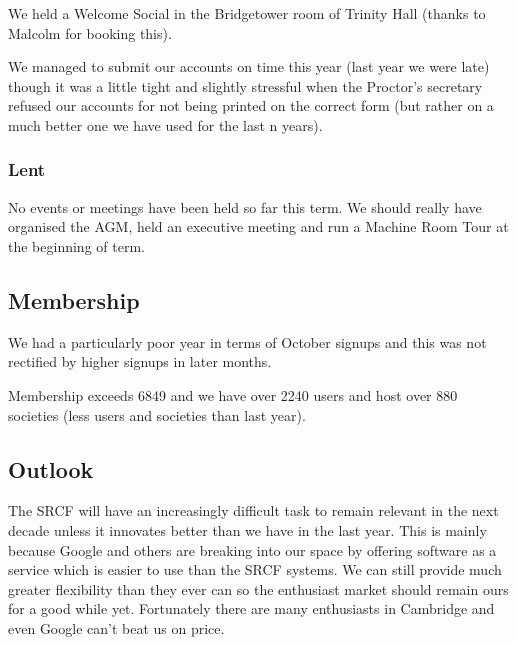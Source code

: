 We held a Welcome Social in the Bridgetower room of Trinity Hall (thanks to Malcolm for booking this).

We managed to submit our accounts on time this year (last year we were late) though it was a little tight and slightly stressful when the Proctor's secretary refused our accounts for not being printed on the correct form (but rather on a much better one we have used for the last n years).

\subsubsection{Lent}
No events or meetings have been held so far this term. We should really have organised the AGM, held an executive meeting and run a Machine Room Tour at the beginning of term.

\subsection{Membership}
We had a particularly poor year in terms of October signups and this was not rectified by higher signups in later months.

Membership exceeds 6849 and we have over 2240 users and host over 880 societies (less users and societies than last year).

\subsection{Outlook}
The SRCF will have an increasingly difficult task to remain relevant in the next decade unless it innovates better than we have in the last year. This is mainly because Google and others are breaking into our space by offering software as a service which is easier to use than the SRCF systems. We can still provide much greater flexibility than they ever can so the enthusiast market should remain ours for a good while yet. Fortunately there are many enthusiasts in Cambridge and even Google can't beat us on price.